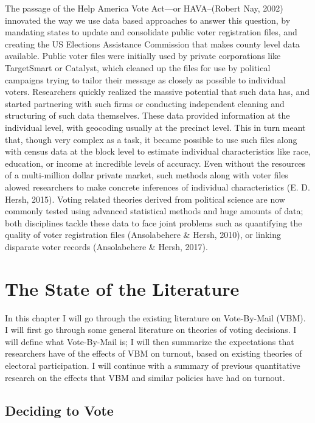 \documentclass[12pt,twoside]{reedthesis}
\begin{document}
  The passage of the Help America Vote Act---or HAVA--(Robert Nay, 2002)
  innovated the way we use data based approaches to answer this question,
  by mandating states to update and consolidate public voter registration
  files, and creating the US Elections Assistance Commission that makes
  county level data available. Public voter files were initially used by
  private corporations like TargetSmart or Catalyst, which cleaned up the
  files for use by political campaigns trying to tailor their message as
  closely as possible to individual voters. Researchers quickly realized
  the massive potential that such data has, and started partnering with
  such firms or conducting independent cleaning and structuring of such
  data themselves. These data provided information at the individual
  level, with geocoding usually at the precinct level. This in turn meant
  that, though very complex as a task, it became possible to use such
  files along with census data at the block level to estimate individual
  characteristics like race, education, or income at incredible levels of
  accuracy. Even without the resources of a multi-million dollar private
  market, such methods along with voter files alowed researchers to make
  concrete inferences of individual characteristics (E. D. Hersh, 2015).
  Voting related theories derived from political science are now commonly
  tested using advanced statistical methods and huge amounts of data; both
  disciplines tackle these data to face joint problems such as quantifying
  the quality of voter registration files (Ansolabehere \& Hersh, 2010),
  or linking disparate voter records (Ansolabehere \& Hersh, 2017).
  
  \chapter{The State of the Literature}\label{rmd-basics}
  
  In this chapter I will go through the existing literature on
  Vote-By-Mail (VBM). I will first go through some general literature on
  theories of voting decisions. I will define what Vote-By-Mail is; I will
  then summarize the expectations that researchers have of the effects of
  VBM on turnout, based on existing theories of electoral participation. I
  will continue with a summary of previous quantitative research on the
  effects that VBM and similar policies have had on turnout.
  
  \section{Deciding to Vote}\label{deciding-to-vote}
  
\end{document}
